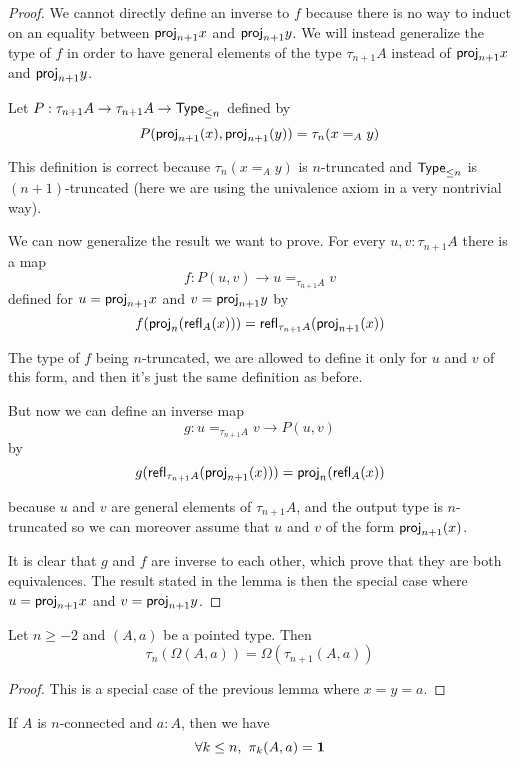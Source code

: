 \begin{proof}
  We cannot directly define an inverse to $f$ because there is no way to induct
  on an equality between $\mathsf{proj}_{n+1}x$ and $\mathsf{proj}_{n+1}y$. We will instead
  generalize the type of $f$ in order to have general elements of the type
  $\tau_{n+1}A$ instead of $\mathsf{proj}_{n+1}x$ and $\mathsf{proj}_{n+1}y$.

  Let $P:\tau_{n+1}A\to\tau_{n+1}A\to\mathsf{Type}_{\le n}$ defined by
  \[P(\mathsf{proj}_{n+1}(x),\mathsf{proj}_{n+1}(y))=\tau_n(x=_Ay)\]

  This definition is correct because $\tau_n(x=_Ay)$ is $n$-truncated and
  $\mathsf{Type}_{\le n}$ is $(n+1)$-truncated (here we are using the univalence axiom in a
  very nontrivial way).

  We can now generalize the result we want to prove. For every $u,v:\tau_{n+1}A$
  there is a map
  \[f:P(u,v)\to{}u=_{\tau_{n+1}A}v\]
  defined for $u=\mathsf{proj}_{n+1}x$ and $v=\mathsf{proj}_{n+1}y$ by
  \[f(\mathsf{proj}_n(\mathsf{refl}_{A}(x)))=\mathsf{refl}_{\tau_{n+1}A}(\mathsf{proj}_{n+1}(x))\]

  The type of $f$ being $n$-truncated, we are allowed to define it only for $u$
  and $v$ of this form, and then it’s just the same definition as before.

  But now we can define an inverse map
  \[g:u=_{\tau_{n+1}A}v\to{}P(u,v)\]
  by
  \[g(\mathsf{refl}_{\tau_{n+1}A}(\mathsf{proj}_{n+1}(x))) = \mathsf{proj}_n(\mathsf{refl}_{A}(x))\]

  because $u$ and $v$ are general elements of $\tau_{n+1}A$, and the output type
  is $n$-truncated so we can moreover assume that $u$ and $v$ of the form
  $\mathsf{proj}_{n+1}(x)$.

  It is clear that $g$ and $f$ are inverse to each other, which prove that they
  are both equivalences. The result stated in the lemma is then the special case
  where $u=\mathsf{proj}_{n+1}x$ and $v=\mathsf{proj}_{n+1}y$.
\end{proof}

\begin{cor}
  Let $n\ge-2$ and $(A,a)$ be a pointed type. Then
  \[\tau_n(\Omega(A,a))=\Omega(\tau_{n+1}(A,a))\]
\end{cor}
\begin{proof}
  This is a special case of the previous lemma where $x=y=a$.
\end{proof}

\begin{lem}
  If $A$ is $n$-connected and $a:A$, then we have
  \[\forall k\le{}n,\ \pi_k(A,a)=\unit\]
\end{lem}

